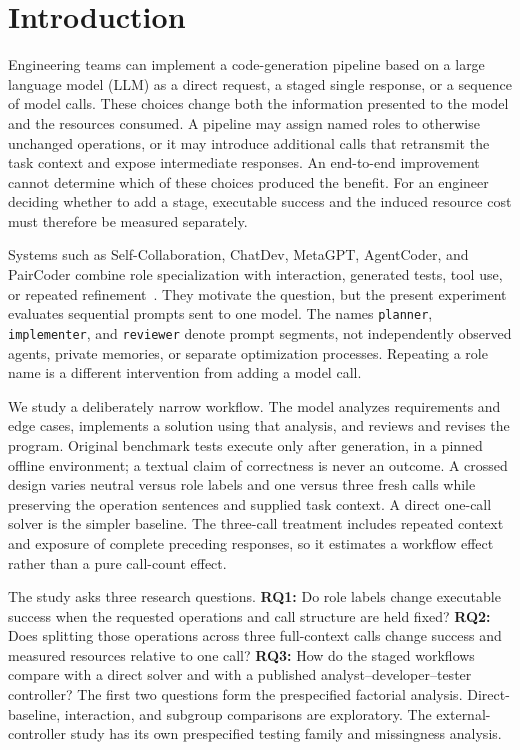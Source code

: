 \section{Introduction}
\aieditnote
Engineering teams can implement a code-generation pipeline based on a large language model (LLM) as a direct request, a staged single response, or a sequence of model calls. These choices change both the information presented to the model and the resources consumed. A pipeline may assign named roles to otherwise unchanged operations, or it may introduce additional calls that retransmit the task context and expose intermediate responses. An end-to-end improvement cannot determine which of these choices produced the benefit. For an engineer deciding whether to add a stage, executable success and the induced resource cost must therefore be measured separately.

Systems such as Self-Collaboration, ChatDev, MetaGPT, AgentCoder, and PairCoder combine role specialization with interaction, generated tests, tool use, or repeated refinement~\cite{dong2023selfcollaboration,qian2024chatdev,hong2024metagpt,huang2023agentcoder,zhang2024paircoder}. They motivate the question, but the present experiment evaluates sequential prompts sent to one model. The names \texttt{planner}, \texttt{implementer}, and \texttt{reviewer} denote prompt segments, not independently observed agents, private memories, or separate optimization processes. Repeating a role name is a different intervention from adding a model call.

We study a deliberately narrow workflow. The model analyzes requirements and edge cases, implements a solution using that analysis, and reviews and revises the program. Original benchmark tests execute only after generation, in a pinned offline environment; a textual claim of correctness is never an outcome. A crossed design varies neutral versus role labels and one versus three fresh calls while preserving the operation sentences and supplied task context. A direct one-call solver is the simpler baseline. The three-call treatment includes repeated context and exposure of complete preceding responses, so it estimates a workflow effect rather than a pure call-count effect.

The study asks three research questions. \textbf{RQ1:} Do role labels change executable success when the requested operations and call structure are held fixed? \textbf{RQ2:} Does splitting those operations across three full-context calls change success and measured resources relative to one call? \textbf{RQ3:} How do the staged workflows compare with a direct solver and with a published analyst--developer--tester controller? The first two questions form the prespecified factorial analysis. Direct-baseline, interaction, and subgroup comparisons are exploratory. The external-controller study has its own prespecified testing family and missingness analysis.

